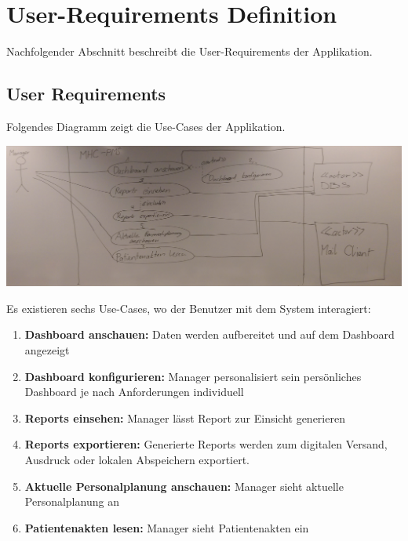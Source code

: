 \documentclass[a4paper]{scrreprt}
\begin{document}
\chapter{User-Requirements Definition}
Nachfolgender Abschnitt beschreibt die User-Requirements der Applikation.


\section{User Requirements}
Folgendes Diagramm zeigt die Use-Cases der Applikation.

\includegraphics[width=1\textwidth]{img/use_case_diagram_20160401.png}

\bigskip

Es existieren sechs Use-Cases, wo der Benutzer mit dem System interagiert:
\begin{enumerate}
\item \textbf{Dashboard anschauen:} Daten werden aufbereitet und auf dem Dashboard angezeigt
\item \textbf{Dashboard konfigurieren:} Manager personalisiert sein persönliches Dashboard je nach Anforderungen individuell
\item \textbf{Reports einsehen:} Manager lässt Report zur Einsicht generieren
\item \textbf{Reports exportieren:} Generierte Reports werden zum digitalen Versand, Ausdruck oder lokalen Abspeichern exportiert.
\item \textbf{Aktuelle Personalplanung anschauen:} Manager sieht aktuelle Personalplanung an
\item \textbf{Patientenakten lesen:} Manager sieht Patientenakten ein
\end{enumerate}
\end{document}
